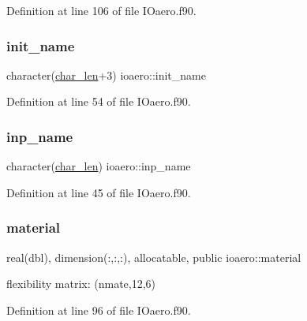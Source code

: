 Definition at line 106 of file I\+Oaero.\+f90.

\mbox{\label{namespaceioaero_a5a12b8b21f86b26e7364428778a85d0b}} 
\subsubsection{\texorpdfstring{init\+\_\+name}{init\_name}}
{\footnotesize\ttfamily character(\hyperlink{namespaceioaero_acd6bdfdcfd986fd1c26261e5996e3b03}{char\+\_\+len}+3) ioaero\+::init\+\_\+name\hspace{0.3cm}{\ttfamily [private]}}



Definition at line 54 of file I\+Oaero.\+f90.

\mbox{\label{namespaceioaero_ae3b39e5c092106ddc3bb8b81daf8bd13}} 
\subsubsection{\texorpdfstring{inp\+\_\+name}{inp\_name}}
{\footnotesize\ttfamily character(\hyperlink{namespaceioaero_acd6bdfdcfd986fd1c26261e5996e3b03}{char\+\_\+len}) ioaero\+::inp\+\_\+name\hspace{0.3cm}{\ttfamily [private]}}



Definition at line 45 of file I\+Oaero.\+f90.

\mbox{\label{namespaceioaero_a83ca534029c39300d045045432607a69}} 
\subsubsection{\texorpdfstring{material}{material}}
{\footnotesize\ttfamily real(dbl), dimension(\+:,\+:,\+:), allocatable, public ioaero\+::material}



flexibility matrix\+: (nmate,12,6) 



Definition at line 96 of file I\+Oaero.\+f90.

\mbox{\label{namespaceioaero_a2463929ef049b49fe7b49011c66cc806}} 
